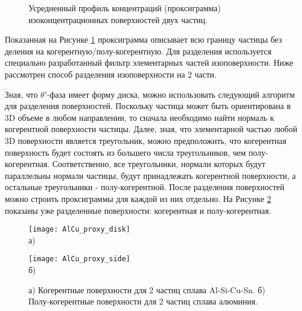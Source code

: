 \begin{figure}[htb]
	\caption{Усредненный профиль концентраций (проксиграмма) изоконцентрационных поверхностей двух частиц.}
	\label{fig:AlCu_proxy_all}
\end{figure}

\FloatBarrier

Показанная на Рисунке \cref{fig:AlCu_proxy_all} проксиграмма описывает всю границу частицы без деления на когерентную/полу-когерентную. Для разделения используется специально разработанный фильтр элементарных частей изоповерхности. Ниже рассмотрен способ разделения изоповерхности на 2 части. 

Зная, что $\theta '$-фаза имеет форму диска, можно использовать следующий алгоритм для разделения поверхностей. Поскольку частица может быть ориентирована в 3D объеме в любом направлении, то сначала необходимо найти нормаль к когерентной поверхности частицы. Далее, зная, что элементарной частью любой 3D поверхности является треугольник, можно предположить, что когерентная поверхность будет состоять из большего числа треугольников, чем полу-когерентная. Соответственно, все треугольники, нормали которых будут параллельны нормали частицы, будут принадлежать когерентной поверхности, а остальные треугольники - полу-когерентной. После разделения поверхностей можно строить проксиграммы для каждой из них отдельно. На Рисунке \cref{fig:AlCu_proxy_disk_side} показаны уже разделенные поверхности: когерентная и полу-когерентная.


\begin{figure}[htb]
	\begin{minipage}[b][][b]{0.49\textwidth}\centering
		\texttt{[image: AlCu\_proxy\_disk]} \\ а)
	\end{minipage}
	\begin{minipage}[b][][b]{0.49\textwidth}\centering
		\texttt{[image: AlCu\_proxy\_side]} \\ б)
	\end{minipage}
	\caption{а) Когерентные поверхности для 2 частиц сплава Al-Si-Cu-Sn. б) Полу-когерентные поверхности для 2 частиц сплава алюминия.}
	\label{fig:AlCu_proxy_disk_side}
\end{figure}

